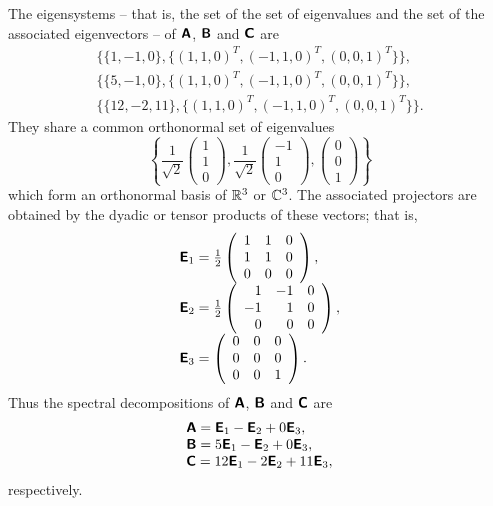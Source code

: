 {The eigensystems -- that is, the set of the set of eigenvalues and the set of the associated eigenvectors -- of $\textsf{\textbf{A}}$,
$\textsf{\textbf{B}}$
and
$\textsf{\textbf{C}}$
are
$$
\begin{array}{l}
\{\{1,-1,  0\}, \{(1, 1, 0)^T, (-1, 1, 0)^T, (0, 0, 1)^T\}\} ,\\
\{\{5, -1, 0\},  \{(1, 1, 0)^T, (-1, 1, 0)^T, (0, 0, 1)^T\}\},\\
\{\{12, -2, 11\},  \{(1, 1, 0)^T, (-1, 1, 0)^T, (0, 0, 1)^T\}\}.
\end{array}
$$
They share a common orthonormal set of eigenvalues
$$
\left\{
\frac{1}{\sqrt{2}}\left(
\begin{array}{rrr}
1\\ 1\\ 0
\end{array}\right),
\frac{1}{\sqrt{2}}\left(
\begin{array}{rrr}
-1\\ 1\\ 0
\end{array}\right),
\left(
\begin{array}{rrr}
0\\ 0\\ 1\end{array}\right)
\right\}
$$
which form an orthonormal basis of ${\Bbb R}^3$ or ${\Bbb C}^3$.
The associated projectors are obtained by the dyadic or tensor products of these vectors; that is,
$$
\begin{array}{l}
\textsf{\textbf{E}}_1= \frac{1}{2}
\left(
\begin{array}{rrr}
1& 1& 0\\
1& 1& 0\\
0& 0& 0
\end{array}
\right),\\
\textsf{\textbf{E}}_2= \frac{1}{2}
\left(
\begin{array}{rrr}
1& -1& 0\\
-1& 1& 0\\
0& 0& 0
\end{array}
\right),\\
\textsf{\textbf{E}}_3=
\left(
\begin{array}{rrr}
0& 0& 0\\
0& 0& 0\\
0& 0& 1
\end{array}
\right).
\end{array}
$$
Thus the spectral decompositions of
$\textsf{\textbf{A}}$,
$\textsf{\textbf{B}}$  and
$\textsf{\textbf{C}}$ are
\begin{equation}
\begin{array}{l}
\textsf{\textbf{A}}= \textsf{\textbf{E}}_1  - \textsf{\textbf{E}}_2  + 0  \textsf{\textbf{E}}_3,\\
\textsf{\textbf{B}}= 5\textsf{\textbf{E}}_1  - \textsf{\textbf{E}}_2  + 0 \textsf{\textbf{E}}_3,\\
\textsf{\textbf{C}}= 12\textsf{\textbf{E}}_1  -2 \textsf{\textbf{E}}_2  + 11\textsf{\textbf{E}}_3,
\end{array}
\label{2011-m-empc}
\end{equation}
respectively.

}
